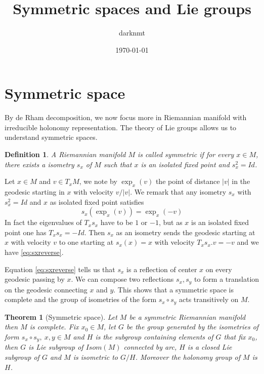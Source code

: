 \documentclass[11pt]{article}
\author{darknmt}
\date{\today}
\title{Symmetric spaces and Lie groups}
\newtheorem{theorem}{Theorem}
\newtheorem{definition}{Definition}
\begin{document}
\maketitle
\tableofcontents


\section{Symmetric space}
\label{sec:org108d5c9}
By de Rham decomposition, we now focus more in Riemannian manifold with irreducible
holonomy representation. The theory of Lie groups allows us to understand symmetric spaces.


\begin{definition}
A Riemannian manifold \(M\) is called \emph{symmetric} if for every \(x\in M\), there exists a isometry
\(s_x\) of \(M\) such that \(x\) is an isolated fixed point and \(s_x^2=Id\).
\end{definition}


Let \(x\in M\) and \(v\in T_xM\), we note by \(\exp_x(v)\) the point of distance \(|v|\) in the geodesic
starting in \(x\) with velocity \(v/|v|\). We remark that any isometry \(s_x\) with \(s_x^2=Id\) and \(x\) as isolated fixed
point satisfies 
\begin{equation}
  \label{eq:sxreverse}
s_x(\exp_x(v)) = \exp_x(-v)
\end{equation}
In fact the eigenvalues of \(T_xs_x\) have to be \(1\) or \(-1\), but as \(x\) is an isolated fixed point
one has \(T_xs_x = -Id\). Then \(s_x\) as an isometry sends the geodesic starting at \(x\) with velocity
\(v\) to one starting at \(s_x(x)=x\) with velocity \(T_xs_x.v = -v\) and we have \eqref{eq:sxreverse}.


Equation \eqref{eq:sxreverse} tells us that \(s_x\) is a reflection of center \(x\) on every geodesic
passing by \(x\). We can compose two reflections \(s_x,s_y\) to form a translation on the geodesic
connecting \(x\) and \(y\). This shows that a symmetric space is complete and the group of isometries
of the form \(s_x\circ s_y\) acts transitively on \(M\).

\begin{theorem}[Symmetric space]
\label{org5c460a3} 
Let \(M\) be a symmetric Riemannian manifold then \(M\) is complete. Fix \(x_0\in
M\), let \(G\) be the group generated by the isometries of form \(s_x\circ s_y,\ x,y\in M\) and \(H\) is the
subgroup containing elements of \(G\) that fix \(x_0\), then \(G\) is Lie subgroup of \(Isom(M)\) connected
by arc, \(H\) is a closed Lie subgroup of \(G\) and \(M\) is isometric to \(G/H\). Moreover the holonomy
group of \(M\) is \(H\).
\end{theorem}
\end{document}
